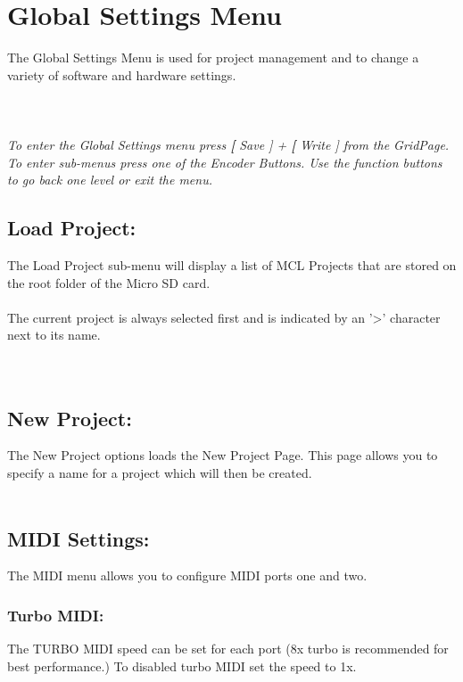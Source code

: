 \chapter{Global Settings Menu}
The Global Settings Menu is used for project management and to change a variety of software and hardware settings.\\\\
\\\\
\textit{To enter the Global Settings menu press \textbf[ Save ] + \textbf[ Write ] from the GridPage.\\
To enter sub-menus press one of the Encoder Buttons. Use the function buttons to go back one level or exit the menu.}
\section{Load Project:}
The Load Project sub-menu will display a list of MCL Projects that are stored on the root folder of the Micro SD card.\\\\
The current project is always selected first and is indicated by an '>' character next to its name.\\\\
\\
\section{New Project:}
The New Project options loads the New Project Page. This page allows you to specify a name for a project which will then be created.\\
\\
\section{MIDI Settings:}
The MIDI menu allows you to configure MIDI ports one and two.\\
\subsection{Turbo MIDI:}
The TURBO MIDI speed can be set for each port (8x turbo is recommended for best performance.) To disabled turbo MIDI set the speed to 1x.

